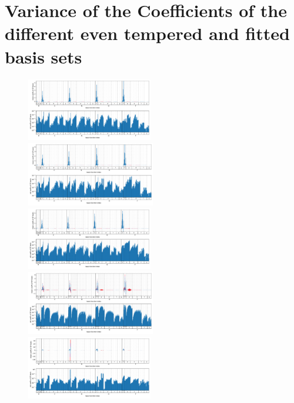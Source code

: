 \section{Variance of the Coefficients of the different even tempered and fitted basis sets}
\begin{figure}
    \centering
        \includegraphics[width=0.49\textwidth]{chapters/results/results_images/var_coeffseven_tempered_3.0}
        \includegraphics[width=0.5\textwidth]{chapters/results/results_images/var_coeffseven_tempered_2.5}
        \includegraphics[width=0.49\textwidth]{chapters/results/results_images/var_coeffseven_tempered_2.0}
        \includegraphics[width=0.5\textwidth]{chapters/results/results_images/var_coeffseven_tempered_1.5}
        \includegraphics[width=0.49\textwidth]{chapters/results/results_images/var_coeffsfitted_basis_3.0}

\end{figure}
